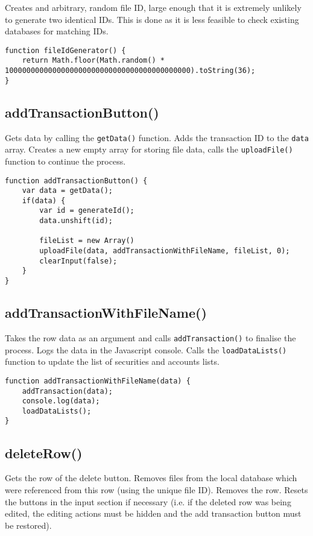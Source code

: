 \documentclass[letterpaper]{article}
\begin{document}
Creates and arbitrary, random file ID, large enough that it is extremely unlikely to generate two identical IDs.
This is done as it is less feasible to check existing databases for matching IDs.

\begin{lstlisting}[firstnumber=224]
function fileIdGenerator() {
    return Math.floor(Math.random() * 1000000000000000000000000000000000000000000).toString(36);
}
\end{lstlisting}

\subsection{addTransactionButton()}

Gets data by calling the \lstinline{getData()} function.
Adds the transaction ID to the \lstinline{data} array.
Creates a new empty array for storing file data, calls the \lstinline{uploadFile()} function to continue the process.

\begin{lstlisting}[firstnumber=228]
function addTransactionButton() {
    var data = getData();
    if(data) {
        var id = generateId();
        data.unshift(id);

        fileList = new Array()
        uploadFile(data, addTransactionWithFileName, fileList, 0);
        clearInput(false);
    }
}
\end{lstlisting}

\subsection{addTransactionWithFileName()}

Takes the row data as an argument and calls \lstinline{addTransaction()} to finalise the process.
Logs the data in the Javascript console.
Calls the \lstinline{loadDataLists()} function to update the list of securities and accounts lists.

\begin{lstlisting}[firstnumber=240]
function addTransactionWithFileName(data) {
    addTransaction(data);
    console.log(data);
    loadDataLists();
}
\end{lstlisting}

\subsection{deleteRow()}

Gets the row of the delete button.
Removes files from the local database which were referenced from this row (using the unique file ID).
Removes the row.
Resets the buttons in the input section if necessary (i.e. if the deleted row was being edited, the editing actions must be hidden and the add transaction button must be restored).
\end{document}
